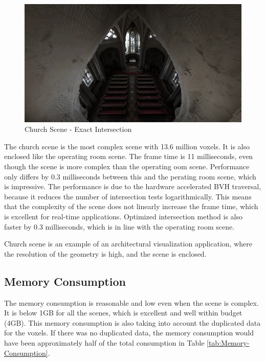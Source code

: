 \documentclass[12pt]{article}
\begin{document}
\begin{figure}[H]
    \begin{center}
        \includegraphics[scale=0.25]{Church}
    \end{center}
    \caption{Church Scene - Exact Intersection}
    \label{fig:Church}
\end{figure}

The church scene is the most complex scene with 13.6 million voxels. It is also enclosed like the operating room scene.
The frame time is 11 milliseconds, even though the scene is more complex than the operating oom scene.
Performance only differs by 0.3 milliseconds between this and the perating room scene, which is impressive.
The performance is due to the hardware accelerated BVH traversal, because it reduces the number of intersection tests logarithmically.
This means that the complexity of the scene does not linearly increase the frame time, which is excellent for real-time applications.
Optimized intersection method is also faster by 0.3 milliseconds, which is in line with the operating room scene.


Church scene is an example of an architectural visualization application, where the resolution of the geometry is high,
and the scene is enclosed.

\subsection{Memory Consumption}

The memory consumption is reasonable and low even when the scene is complex.
It is below 1GB for all the scenes, which is excellent and well within budget (4GB).
This memory consumption is also taking into account the duplicated data for the voxels. 
If there was no duplicated data, the memory consumption would have been approximately half of the total consumption in Table \ref{tab:Memory-Consumption}.
\end{document}
